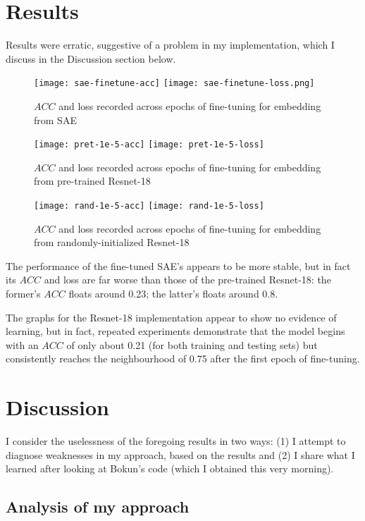 \section{Results}

Results were erratic, suggestive of a problem in my implementation, which I discuss in the Discussion section below.

\begin{figure}[h]
\caption{$ACC$ and loss recorded across epochs of fine-tuning for embedding from SAE}
\centering
\texttt{[image: sae-finetune-acc]}
\texttt{[image: sae-finetune-loss.png]}
\end{figure}

\begin{figure}[h]
\caption{$ACC$ and loss recorded across epochs of fine-tuning for embedding from pre-trained Resnet-18}
\centering
\texttt{[image: pret-1e-5-acc]}
\texttt{[image: pret-1e-5-loss]}
\end{figure}

\begin{figure}[h]
\caption{$ACC$ and loss recorded across epochs of fine-tuning for embedding from randomly-initialized Resnet-18}
\centering
\texttt{[image: rand-1e-5-acc]}
\texttt{[image: rand-1e-5-loss]}
\end{figure}

The performance of the fine-tuned SAE's appears to be more stable, but in fact its $ACC$ and loss are far worse than those of the pre-trained Resnet-18: the former's $ACC$ floats around 0.23; the latter's floats around 0.8.

The graphs for the Resnet-18 implementation appear to show no evidence of learning, but in fact, repeated experiments demonstrate that the model begins with an $ACC$ of only about 0.21 (for both training and testing sets) but consistently reaches the neighbourhood of 0.75 after the first epoch of fine-tuning.

\section{Discussion}

I consider the uselessness of the foregoing results in two ways: (1) I attempt to diagnose weaknesses in my approach, based on the results and (2) I share what I learned after looking at Bokun's code (which I obtained this very morning).

\subsection{Analysis of my approach}

